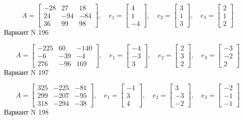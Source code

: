\documentclass[11pt]{report}
\begin{document}
$$A = \left[\begin{matrix}-28 & 27 & 18\\24 & -94 & -84\\36 & 99 & 98\end{matrix}\right],\quad e_1 = \left[\begin{matrix}4\\1\\-4\end{matrix}\right],\quad e_2 = \left[\begin{matrix}3\\1\\3\end{matrix}\right],\quad e_3 = \left[\begin{matrix}2\\1\\2\end{matrix}\right]$$Вариант N 196

$$A = \left[\begin{matrix}-225 & 60 & -140\\-6 & -39 & -4\\276 & -96 & 169\end{matrix}\right],\quad e_1 = \left[\begin{matrix}-4\\-3\\3\end{matrix}\right],\quad e_2 = \left[\begin{matrix}2\\3\\2\end{matrix}\right],\quad e_3 = \left[\begin{matrix}-3\\-2\\2\end{matrix}\right]$$Вариант N 197

$$A = \left[\begin{matrix}325 & -225 & -81\\299 & -207 & -95\\318 & -294 & -38\end{matrix}\right],\quad e_1 = \left[\begin{matrix}-1\\3\\4\end{matrix}\right],\quad e_2 = \left[\begin{matrix}3\\-3\\-2\end{matrix}\right],\quad e_3 = \left[\begin{matrix}-2\\-1\\-1\end{matrix}\right]$$Вариант N 198
\end{document}
